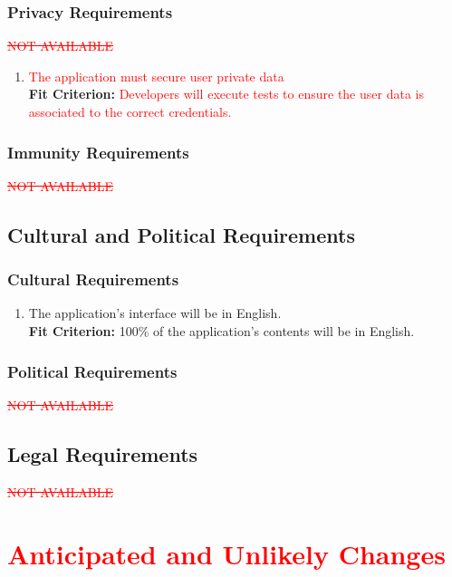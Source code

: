 \documentclass[12pt,letterpaper]{article}
\begin{document}
\subsubsection{Privacy Requirements}
\textcolor{red}{\sout{NOT AVAILABLE}}
\begin{enumerate}[{SE}3.] 
	\item {\textcolor{red}{The application must secure user private data}} \\
	{\textbf{Fit Criterion:} {\textcolor{red}{Developers will execute tests to ensure the user data is associated to the correct credentials.}}}
\end{enumerate}
\subsubsection{Immunity Requirements}
\textcolor{red}{\sout{NOT AVAILABLE}}
\subsection{Cultural and Political Requirements}
\subsubsection{Cultural Requirements}
\begin{enumerate}[{CU}1] 
	\item The application's interface will be in English. \\
	{\textbf{Fit Criterion:} 100\% of the application's contents will be in English. }
\end{enumerate}
\subsubsection{Political Requirements}
\textcolor{red}{\sout{NOT AVAILABLE}}
\subsection{Legal Requirements}
\textcolor{red}{\sout{NOT AVAILABLE}}


\section{\textcolor{red}{Anticipated and Unlikely Changes}}
\end{document}
